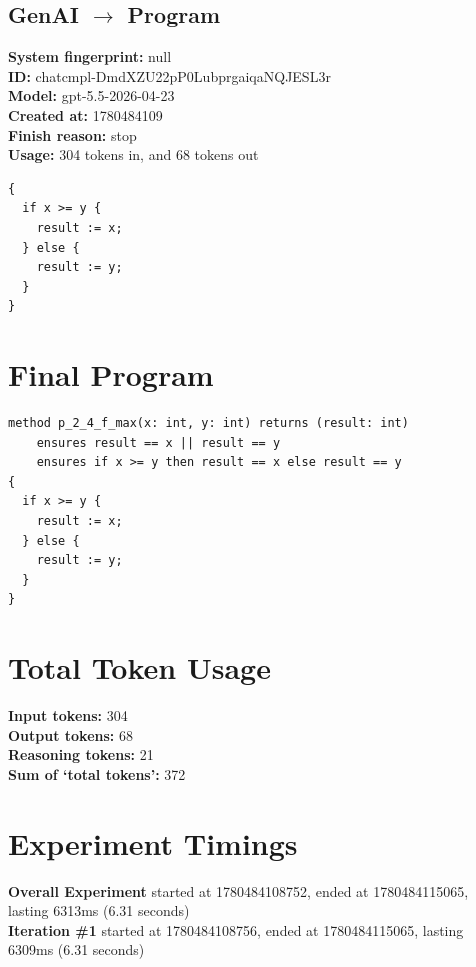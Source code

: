 \documentclass{article}
\begin{document}
\subsection*{GenAI $\rightarrow$ Program}
\textbf{System fingerprint: }null
\\\textbf{ID: }chatcmpl-DmdXZU22pP0LubprgaiqaNQJESL3r
\\\textbf{Model: }gpt-5.5-2026-04-23
\\\textbf{Created at: }1780484109
\\\textbf{Finish reason: }stop
\\\textbf{Usage: }304 tokens in, and 68 tokens out
\begin{lstlisting}
{
  if x >= y {
    result := x;
  } else {
    result := y;
  }
}
\end{lstlisting}
\section*{Final Program}
\begin{lstlisting}
method p_2_4_f_max(x: int, y: int) returns (result: int)
	ensures result == x || result == y
	ensures if x >= y then result == x else result == y
{
  if x >= y {
    result := x;
  } else {
    result := y;
  }
}
\end{lstlisting}
\section*{Total Token Usage}
\textbf{Input tokens: }304
\\\textbf{Output tokens: }68
\\\textbf{Reasoning tokens: }21
\\\textbf{Sum of `total tokens': }372
\section*{Experiment Timings}
\textbf{Overall Experiment} started at 1780484108752, ended at 1780484115065, lasting 6313ms (6.31 seconds)
\\\textbf{Iteration \#1} started at 1780484108756, ended at 1780484115065, lasting 6309ms (6.31 seconds)
\end{document}
